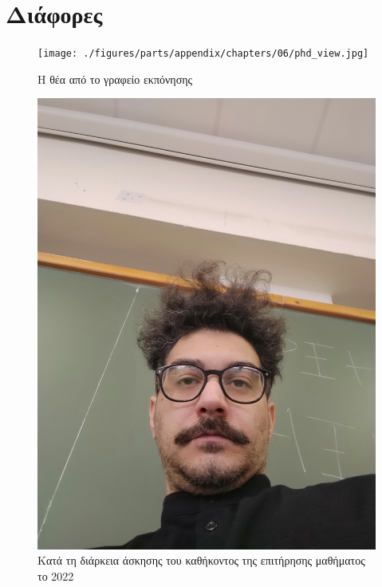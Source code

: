 \section{Διάφορες}
\begin{figure}[H]\centering
  \texttt{[image: ./figures/parts/appendix/chapters/06/phd\_view.jpg]}
  \caption{\small Η θέα από το γραφείο εκπόνησης}
\end{figure}
\begin{figure}[H]\centering
  \includegraphics[scale=0.15]{./figures/parts/appendix/chapters/06/epitirisi.jpg}
  \caption{\small Κατά τη διάρκεια άσκησης του καθήκοντος της επιτήρησης
           μαθήματος το 2022}
\end{figure}
